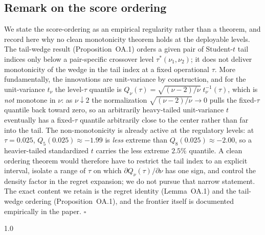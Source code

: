 \documentclass[11pt]{article}
\begin{document}
\subsection*{Remark on the score ordering}
We state the score-ordering as an empirical regularity rather than a
theorem, and record here why no clean monotonicity theorem holds at the
deployable levels. The tail-wedge result (Proposition~OA.1)
orders a given pair of Student-$t$ tail indices only below a pair-specific
crossover level $\tau^*(\nu_1,\nu_2)$; it does not deliver monotonicity of
the wedge in the tail index at a fixed operational $\tau$. More
fundamentally, the innovations are unit-variance by construction, and for
the unit-variance $t_\nu$ the level-$\tau$ quantile is
$Q_\nu(\tau)=\sqrt{(\nu-2)/\nu}\;t_\nu^{-1}(\tau)$, which is \emph{not}
monotone in $\nu$: as $\nu\downarrow2$ the normalization
$\sqrt{(\nu-2)/\nu}\to0$ pulls the fixed-$\tau$ quantile back toward zero,
so an arbitrarily heavy-tailed unit-variance $t$ eventually has a
fixed-$\tau$ quantile arbitrarily close to the center rather than far into
the tail. The non-monotonicity is already active at the regulatory levels:
at $\tau=0.025$, $Q_5(0.025)\approx-1.99$ is \emph{less} extreme than
$Q_8(0.025)\approx-2.00$, so a heavier-tailed standardized $t$ carries the
less extreme $2.5\%$ quantile. A clean ordering theorem would therefore
have to restrict the tail index to an explicit interval, isolate a range
of $\tau$ on which $\partial Q_\nu(\tau)/\partial\nu$ has one sign, and
control the density factor in the regret expansion; we do not pursue that
narrow statement. The exact content we retain is the regret identity
(Lemma~OA.1) and the tail-wedge ordering (Proposition~OA.1), and the frontier itself is documented empirically in the paper.
\hfill$\square$





\begin{spacing}{1.0}


\end{spacing}
\end{document}

